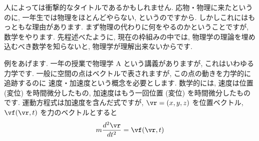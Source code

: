 \documentclass[openany, a4paper, oneside]{jsbook}
\begin{document}
人によっては衝撃的なタイトルであるかもしれません.
応物・物理に来たというのに, 一年生では物理をほとんどやらない, というのですから.
しかしこれにはもっともな理由があります.
まず物理の代わりに何をやるのかということですが, 数学をやります.
先程述べたように, 現在の枠組みの中では,
物理学の理論を埋め込むべき数学を知らないと, 物理学が理解出来ないからです.

例をあげます.
一年の授業で物理学 A という講義がありますが, これはいわゆる力学です.
一般に空間の点はベクトルで表されますが, この点の動きを力学的に追跡するのに
速度・加速度という概念を必要とします.
数学的には, 速度は位置 (変位) を時間微分したもの,
加速度はもう一回位置 (変位) を時間微分したものです.
運動方程式は加速度を含んだ式ですが,
$\vr = (x, y, z)$ を位置ベクトル,
$\vf (\vr, t)$ を力のベクトルとすると
\begin{equation}
 m\frac{d^{2}\vr}{dt^{2}}=\vf (\vr, t)
\end{equation}
\end{document}
